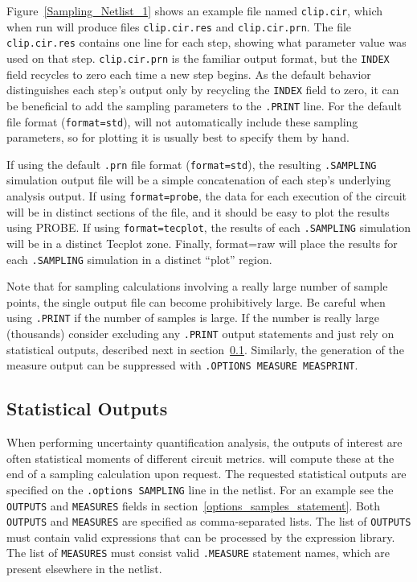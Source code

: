 Figure~\ref{Sampling_Netlist_1} shows an example file named \verb+clip.cir+, which when run will produce files
\verb+clip.cir.res+ and \verb+clip.cir.prn+.  The file \verb+clip.cir.res+
contains one line for each step, showing what parameter value was used
on that step.  \verb+clip.cir.prn+ is the familiar output format, but
the \verb+INDEX+ field recycles to zero each time a new step begins.
As the default behavior distinguishes each step's output only by recycling 
the \verb+INDEX+ field to zero, it can be beneficial to add the sampling
parameters to the \verb+.PRINT+ line.   For the default file format 
(\texttt{format=std}), \Xyce{} will not automatically include these sampling parameters,
so for plotting it is usually best to specify them by hand.

If using the default \texttt{.prn} file format (\texttt{format=std}), the 
resulting \texttt{.SAMPLING} simulation output file will be a simple concatenation of
each step's underlying analysis output.
If using \texttt{format=probe}, the data for each execution of the circuit
will be in distinct sections of the file, and it should be easy to 
plot the results using PROBE.  If using \texttt{format=tecplot}, 
the results of each \texttt{.SAMPLING} simulation will be in a distinct
Tecplot zone. Finally, format=raw will place the results for each \texttt{.SAMPLING} 
simulation in a distinct ``plot'' region. 

Note that for sampling calculations involving a really large number of sample 
points, the single output file can become prohibitively large.  Be careful when 
using \verb|.PRINT| if the number of samples is large.   If the number is really 
large (thousands) consider excluding any \verb|.PRINT| output statements and 
just rely on statistical outputs, described next in section~\ref{statistical_outputs}.
Similarly, the generation of the measure output can be suppressed with 
\texttt{.OPTIONS MEASURE MEASPRINT}.

\subsection{Statistical Outputs}
\label{statistical_outputs}
When performing uncertainty quantification analysis, the outputs of interest are 
often statistical moments of different circuit metrics.   \Xyce{} will compute these at the
end of a sampling calculation upon request.  The requested statistical outputs are 
specified on the \texttt{.options SAMPLING} line in the netlist.  For an example 
see the \texttt{OUTPUTS} and \texttt{MEASURES} fields in section~\ref{options_samples_statement}.  
Both \texttt{OUTPUTS} and \texttt{MEASURES} are specified as comma-separated 
lists.  The list of \texttt{OUTPUTS} must contain valid expressions that can be 
processed by the \Xyce{} expression library.  The list of \texttt{MEASURES} must 
consist valid \texttt{.MEASURE} statement names, which are present elsewhere in 
the netlist.

